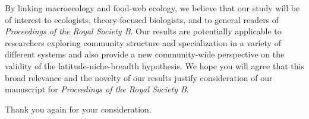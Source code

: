 \documentclass[12pt]{letter}
\newcommand{\myjournal}{\emph{Proceedings of the Royal Society B}}
\begin{document}
\begin{letter}
By linking macroecology and food-web ecology, we believe that our study will
be of interest to ecologists, theory-focused biologists, and to general
readers of \myjournal. Our results are potentially applicable to researchers
exploring community structure and specialization in a variety of different
systems and also provide a new community-wide perspective on the validity of
the latitude-niche-breadth hypothesis. We hope you will agree that this broad
relevance and the novelty of our results justify consideration of our
manuscript for \myjournal.


Thank you again for your consideration.



\end{letter}


\end{document}
